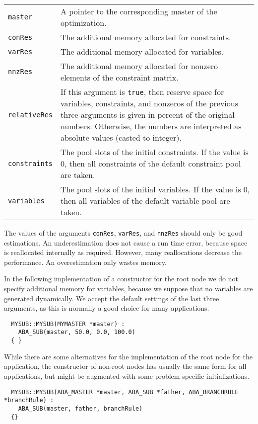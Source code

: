 \begin{center}
\begin{tabular}{lp{}}
  {\tt master}       &A pointer to the corresponding master of the
                      optimization.\\
  {\tt conRes}       &The additional memory allocated for constraints.\\
  {\tt varRes}       &The additional memory allocated for variables.\\
  {\tt nnzRes}       &The additional memory allocated for nonzero
                      elements of the constraint matrix.\\
  {\tt relativeRes}  &If this argument is {\tt true}, then reserve space
                      for variables, constraints, and nonzeros of
                      the previous three arguments is given in
                      percent of the original numbers. Otherwise,
                      the numbers are interpreted as absolute values
                      (casted to integer).\\
  {\tt constraints}  &The pool slots of the initial constraints.
                      If the value is 0, then all constraints
                      of the default constraint pool are taken.\\
  {\tt variables}    &The pool slots of the initial variables.
                      If the value is 0, then all variables of the
                      default variable pool are taken.\\

\end{tabular}
\end{center}

\noindent
The values of 
the arguments {\tt conRes}, {\tt varRes}, and {\tt nnzRes} should only be
good estimations. An underestimation does not cause a run time error,
because space is reallocated internally as required. However,
many reallocations decrease the performance. 
An overestimation only wastes memory.

In the following implementation of a constructor for the root node
we do not specify additional memory for variables, because we suppose
that no variables are generated dynamically. We accept the default settings of the last three arguments, as this
is normally a good choice for many applications.
\begin{verbatim}
  MYSUB::MYSUB(MYMASTER *master) :
    ABA_SUB(master, 50.0, 0.0, 100.0)
  { }
\end{verbatim}
While there are some alternatives for the implementation of the
root node for the application, the constructor of non-root nodes
has usually the same form for all applications, but might be
augmented with some problem specific initializations.
\begin{verbatim}
  MYSUB::MYSUB(ABA_MASTER *master, ABA_SUB *father, ABA_BRANCHRULE *branchRule) :
    ABA_SUB(master, father, branchRule) 
  {}
\end{verbatim}

